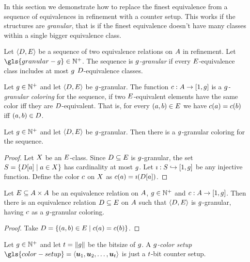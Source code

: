 
In this section we demonstrate how to replace the finest equivalence from a
sequence of equivalences in refinement with a counter setup. This works if the
structures are \emph{granular},
that is if the finest equivalence doesn't have many classes within a single
bigger equivalence class.

\begin{definition}
Let $\left\langle D,E \right\rangle$ be a sequence of two equivalence relations on $A$ in
refinement.
Let $\gls{granular-g} \in \pNats$.
The sequence is \emph{$g$-granular} if every $E$-equivalence class
includes at most $g$ $D$-equivalence classes.
\end{definition}
\begin{definition}
Let $g \in \mathbb{N}^{+}$ and let $\left\langle D,E \right\rangle$ be $g$-granular.
The function $c : A \to [1,g]$ is a \emph{$g$-granular coloring} for
the sequence,
if two $E$-equivalent elements have the same color iff they are
$D$-equivalent.
That is, for every $(a,b) \in E$ we have
$c(a) = c(b)$ iff $(a,b) \in D$.
\end{definition}
\begin{remark}\label{rem:granular-exists}
Let $g \in \mathbb{N}^{+}$ and let $\left\langle D,E \right\rangle$ be $g$-granular.
Then there is a $g$-granular coloring for the sequence.
\end{remark}
\begin{proof}
Let $X$ be an $E$-class.
Since $D \subseteq E$ is $g$-granular,
the set $S = \left\{D[a]\mathrel{}\middle|\mathrel{}a \in X\right\}$ has cardinality at most
$g$.
Let $\imath : S \hookrightarrow [1,g]$ be any injective function.
Define the color $c$ on $X$ as $c(a) = \imath(D[a])$.
\end{proof}

\begin{remark}\label{rem:granular-color}
Let $E \subseteq {A\times A}$ be an equivalence relation on $A$,
$g \in \mathbb{N}^{+}$ and $c : A \to [1,g]$.
Then there is an equivalence relation $D \subseteq E$ on $A$ such
that $\left\langle D,E \right\rangle$ is $g$-granular, having $c$ as a $g$-granular
coloring.
\end{remark}
\begin{proof}
Take $D = \left\{(a,b) \in E\mathrel{}\middle|\mathrel{}c(a) = c(b)\right\}$.
\end{proof}

\begin{definition}
Let $g \in \mathbb{N}^{+}$ and let $t = \|g\|$ be the bitsize of $g$.
A \emph{$g$-color setup}
${\gls{color-setup} = \seq{\suu1,\suu2,\dots,\suu\tbit}}$ is just a $t$-bit
counter setup.
\end{definition}

